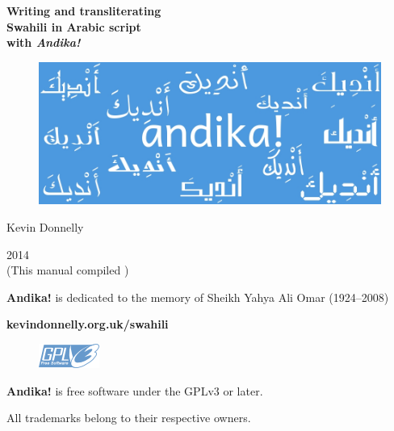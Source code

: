 \begin{titlepage}
\begin{center}

{\Huge\textbf{Writing and transliterating}}\\[0.5cm]
{\Huge\textbf{Swahili in Arabic script}}\\[0.5cm]
{\Huge\textbf{with \textit{Andika!}}}

\vspace{2cm}

\begin{figure}[h]
 \centering
 \includegraphics[keepaspectratio=true, scale=0.6]{../images/andika_960.jpg}
\end{figure}
\vspace{2cm}

{\LARGE{Kevin Donnelly}}
\vspace{1.5cm}

{\Large{2014}}\\
(This manual compiled \todayuk)

\vspace{1.5cm}
\textbf{Andika!} is dedicated to the memory of Sheikh Yahya Ali Omar (1924--2008)\\

\textbf{kevindonnelly.org.uk/swahili}
\begin{figure}[H]
 \centering
 \includegraphics[keepaspectratio=true, scale=0.1]{../images/gpl3_blue.png}
\end{figure}

\textbf{Andika!} is free software under the GPLv3 or later.

All trademarks belong to their respective owners.

\end{center}
\end{titlepage}


\tableofcontents  %
\listoffigures
\listoftables

